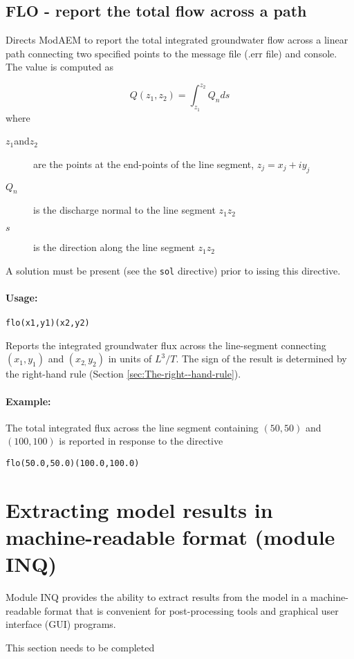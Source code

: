 \subsection{FLO\label{cmd:flo} - report the total flow across a path}

Directs ModAEM to report the total integrated groundwater flow across
a linear path connecting two specified points to the message
file (.err file) and console. The value is computed as

\[
Q(z_{1},z_{2})=\int_{z_{1}}^{z_{2}}Q_{n}ds
\]
where
\begin{description}
\item [{$z_{1}$and$z_{2}$}] are
the points at the end-points of the line segment, $z_{j}=x_{j}+iy_{j}$
\item [{$Q_{n}$}] is the discharge normal to the line segment
$z_{1}z_{2}$
\item [{$s$}] is the direction along the line segment $z_{1}z_{2}$
\end{description}
A solution must be present (see the \texttt{sol} directive) prior
to issing this directive. 


\paragraph{Usage:}
\begin{verbatim}
flo(x1,y1)(x2,y2)
\end{verbatim}
Reports the integrated groundwater flux across the line-segment connecting
$(x_{1},y_{1})$ and $(x_{2,}y_{2})$ in units of $L^{3}/T$. The
sign of the result is determined by the right-hand rule (Section \ref{sec:The-right--hand-rule}).


\paragraph{Example:}

The total integrated flux across the line segment containing $(50,50)$
and $(100,100)$ is reported in response to the directive
\begin{verbatim}
flo(50.0,50.0)(100.0,100.0)
\end{verbatim}

\section{Extracting model results in machine-readable format (module INQ)\label{sec:module-INQ}}

Module INQ provides the ability to extract results from the model
in a machine-readable format that is convenient for post-processing
tools and graphical user interface (GUI) programs.

This section needs to be completed
